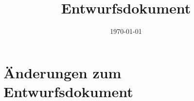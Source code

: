 \documentclass{article}
\title{Entwurfsdokument}
\date{\today}
\begin{document}
	\maketitle
	\tableofcontents
	\clearpage
	\section{Änderungen zum Entwurfsdokument}
	
	
	
	
\end{document}
